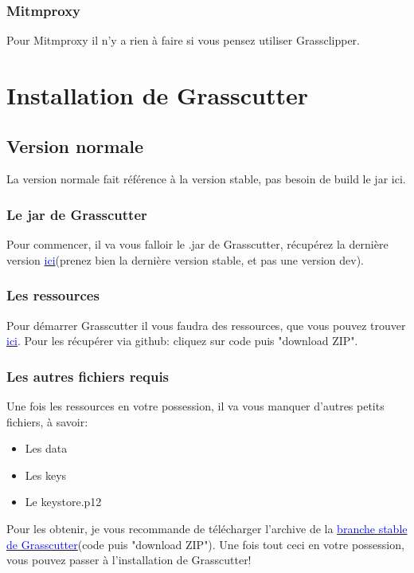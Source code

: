 \documentclass{article}
\begin{document}
\subsubsection{Mitmproxy}
Pour Mitmproxy il n'y a rien à faire si vous pensez utiliser Grassclipper. 

\section{Installation de Grasscutter}

\subsection{Version normale}
La version normale fait référence à la version stable, pas besoin de build le jar ici.

\subsubsection{Le jar de Grasscutter}
Pour commencer, il va vous falloir le .jar de Grasscutter, récupérez la dernière version \href{https://github.com/Grasscutters/Grasscutter/releases}{\textcolor{blue}{ici}}(prenez bien la dernière version stable, et pas une version dev).

\subsubsection{Les ressources}
Pour démarrer Grasscutter il vous faudra des ressources, que vous pouvez trouver \href{https://github.com/Koko-boya/Grasscutter_Resources/tree/main}{\textcolor{blue}{ici}}. Pour les récupérer via github: cliquez sur code puis "download ZIP".

\subsubsection{Les autres fichiers requis}
Une fois les ressources en votre possession, il va vous manquer d'autres petits fichiers, à savoir:
\begin{itemize}
	\item Les data
	\item Les keys
	\item Le keystore.p12
\end{itemize}

Pour les obtenir, je vous recommande de télécharger l'archive de la \href{https://github.com/Grasscutters/Grasscutter/tree/stable}{\textcolor{blue}{branche stable de Grasscutter}}(code puis "download ZIP").\newline
Une fois tout ceci en votre possession, vous pouvez passer à l'installation de Grasscutter!
\end{document}
